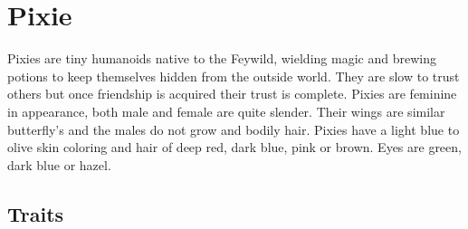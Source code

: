\documentclass{article}
\begin{document}
\section{Pixie}

Pixies are tiny humanoids native to the Feywild, wielding magic and brewing potions to keep themselves hidden from the outside world. They are slow to trust others but once friendship is acquired their trust is complete.
Pixies are feminine in appearance, both male and female are quite slender. Their wings are similar butterfly's and the males do not grow and bodily hair. Pixies have a light blue to olive skin coloring and hair of deep red, dark blue, pink or brown. Eyes are green, dark blue or hazel.

\subsection{Traits}
\end{document}

